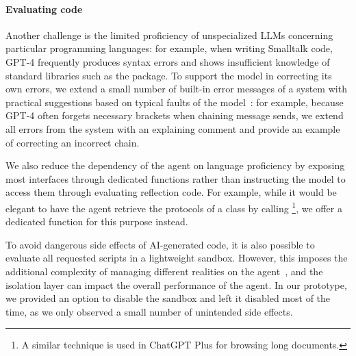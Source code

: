 \paragraph{Evaluating code}
Another challenge is the limited proficiency of unspecialized LLMs concerning particular programming languages:
for example, when writing Smalltalk code, GPT-4 frequently produces syntax errors and shows insufficient knowledge of standard libraries such as the  package.
To support the model in correcting its own errors, we extend a small number of built-in error messages of a system with practical suggestions based on typical faults of the model~\cite{traver2010compiler}:
for example, because GPT-4 often forgets necessary brackets when chaining message sends, we extend all  errors from the system with an explaining comment and provide an example of correcting an incorrect chain.

We also reduce the dependency of the agent on language proficiency by exposing most interfaces through dedicated functions rather than instructing the model to access them through evaluating reflection code.
For example, while it would be elegant to have the agent retrieve the protocols of a class by calling \footnote{A similar technique is used in ChatGPT Plus for browsing long documents.}, we offer a dedicated  function for this purpose instead.

To avoid dangerous side effects of AI-generated code, it is also possible to evaluate all requested scripts in a lightweight sandbox.
However, this imposes the additional complexity of managing different realities on the agent~\cite{rehwaldt2012exploring}, and the isolation layer can impact the overall performance of the agent.
In our prototype, we provided an option to disable the sandbox and left it disabled most of the time, as we only observed a small number of unintended side effects.
